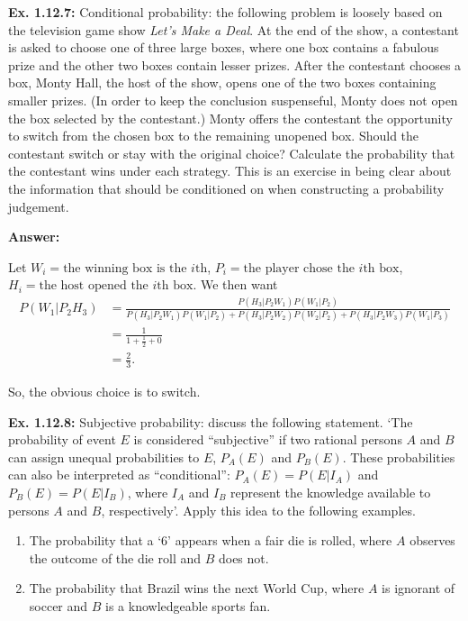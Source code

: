 \documentclass{article}
\begin{document}
\textbf{Ex. 1.12.7: }Conditional probability: the following problem is loosely based on the television game show \textit{Let's Make a Deal}. At the end of the show, a contestant is asked to choose one of three large boxes, where one box contains a fabulous prize and the other two boxes contain lesser prizes. After the contestant chooses a box, Monty Hall, the host of the show, opens one of the two boxes containing smaller prizes. (In order to keep the conclusion suspenseful, Monty does not open the box selected by the contestant.) Monty offers the contestant the opportunity to switch from the chosen box to the remaining unopened box. Should the contestant switch or stay with the original choice? Calculate the probability that the contestant wins under each strategy. This is an exercise in being clear about the information that should be conditioned on when constructing a probability judgement.

\textbf{Answer:}

Let $W_i=\text{the winning box is the $i$th}$, $P_i=\text{the player chose the $i$th box}$, $H_i=\text{the host opened the $i$th box}$. We then want
\begin{align*}
	P(W_1|P_2H_3)&=\frac{P(H_3|P_2W_1)P(W_1|P_2)}{P(H_3|P_2W_1)P(W_1|P_2)+P(H_3|P_2W_2)P(W_2|P_2)+P(H_3|P_2W_3)P(W_1|P_3)}\\
	&=\frac{1}{1+\frac12+0}\\
	&=\frac23.
\end{align*}

So, the obvious choice is to switch.

\textbf{Ex. 1.12.8: }Subjective probability: discuss the following statement. `The probability of event $E$ is considered ``subjective'' if two rational persons $A$ and $B$ can assign unequal probabilities to $E$, $P_A(E)$ and $P_B(E)$. These probabilities can also be interpreted as ``conditional'': $P_A(E)=P(E|I_A)$ and $P_B(E)=P(E|I_B)$, where $I_A$ and $I_B$ represent the knowledge available to persons $A$ and $B$, respectively'. Apply this idea to the following examples.
\begin{enumerate}[label=\alph*]
	\item The probability that a `$6$' appears when a fair die is rolled, where $A$ observes the outcome of the die roll and $B$ does not.
	\item The probability that Brazil wins the next World Cup, where $A$ is ignorant of soccer and $B$ is a knowledgeable sports fan.
\end{enumerate}
\end{document}
